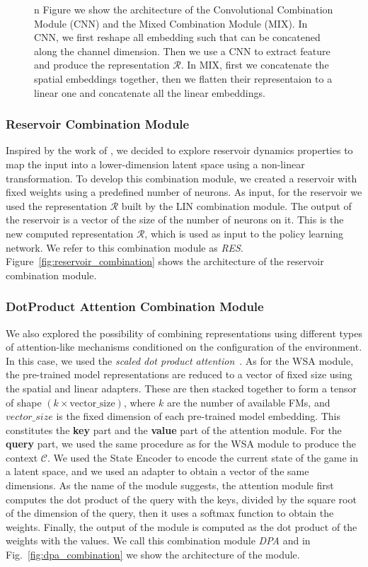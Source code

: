 \begin{figure}[ht]
    \caption{n Figure we show the architecture of the Convolutional Combination Module (CNN) and the Mixed Combination Module (MIX). In CNN, we first reshape all embedding such that can be concatened along the channel dimension. Then we use a CNN to extract feature and produce the representation $\mathcal{R}$. In MIX, first we concatenate the spatial embeddings together, then we flatten their representaion to a linear one and concatenate all the linear embeddings.}
    \label{fig:conv_combination}
\end{figure}

\subsubsection{Reservoir Combination Module}
\label{subsubsec:reservoir_combination}
Inspired by the work of \citet{gallicchio2017}, we decided to explore reservoir dynamics properties to map the input into a lower-dimension latent space using a non-linear transformation.
To develop this combination module, we created a reservoir with fixed weights using a predefined number of neurons.
As input, for the reservoir we used the representation $\mathcal{R}$ built by the LIN combination module.
The output of the reservoir is a vector of the size of the number of neurons on it.
This is the new computed representation $\mathcal{R}$, which is used as input to the policy learning network.
We refer to this combination module as \textit{RES}.
Figure~\ref{fig:reservoir_combination} shows the architecture of the reservoir combination module.

\subsubsection{DotProduct Attention Combination Module}
\label{subsubsec:dpa}

We also explored the possibility of combining representations using different types of attention-like mechanisms conditioned on the configuration of the environment.
In this case, we used the \textit{scaled dot product attention}~\citep{vaswani2017attention}.
As for the WSA module, the pre-trained model representations are reduced to a vector of fixed size using the spatial and linear adapters.
These are then stacked together to form a tensor of shape $(k \times \text{vector\_size})$, where $k$ are the number of available FMs, and $vector\_size$ is the fixed dimension of each pre-trained model embedding.
This constitutes the \textbf{key} part and the \textbf{value} part of the attention module.
For the \textbf{query} part, we used the same procedure as for the WSA module to produce the context $\mathcal{C}$.
We used the State Encoder to encode the current state of the game in a latent space, and we used an adapter to obtain a vector of the same dimensions.
As the name of the module suggests, the attention module first computes the dot product of the query with the keys, divided by the square root of the dimension of the query, then it uses a softmax function to obtain the weights.
Finally, the output of the module is computed as the dot product of the weights with the values.
We call this combination module \textit{DPA} and in Fig.~\ref{fig:dpa_combination} we show the architecture of the module.



